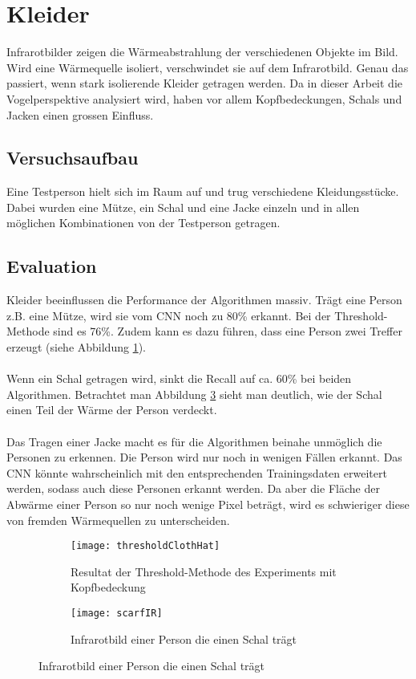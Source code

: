 \section{Kleider}
\label{sec:cloths}

Infrarotbilder zeigen die Wärmeabstrahlung der verschiedenen Objekte im Bild. Wird eine Wärmequelle isoliert, verschwindet sie auf dem Infrarotbild. Genau das passiert, wenn stark isolierende Kleider getragen werden. Da in dieser Arbeit die Vogelperspektive analysiert wird, haben vor allem Kopfbedeckungen, Schals und Jacken einen grossen Einfluss. 

\subsection{Versuchsaufbau}

Eine Testperson hielt sich im Raum auf und trug verschiedene Kleidungsstücke. Dabei wurden eine Mütze, ein Schal und eine Jacke einzeln und in allen möglichen Kombinationen von der Testperson getragen.

\subsection{Evaluation}
Kleider beeinflussen die Performance der Algorithmen massiv. Trägt eine Person z.B. eine Mütze, wird sie vom \gls{CNN} noch zu 80\% erkannt. Bei der Threshold-Methode sind es 76\%. Zudem kann es dazu führen, dass eine Person zwei Treffer erzeugt (siehe Abbildung \ref{fig:thresholdClothHat}).\\
\\
Wenn ein Schal getragen wird, sinkt die Recall auf ca. 60\% bei beiden Algorithmen. Betrachtet man Abbildung \ref{fig:scarfIR} sieht man deutlich, wie der Schal einen Teil der Wärme der Person verdeckt.\\
\\
Das Tragen einer Jacke macht es für die Algorithmen beinahe unmöglich die Personen zu erkennen. Die Person wird nur noch in wenigen Fällen erkannt. Das \gls{CNN} könnte wahrscheinlich mit den entsprechenden Trainingsdaten erweitert werden, sodass auch diese Personen erkannt werden. Da aber die Fläche der Abwärme einer Person so nur noch wenige Pixel beträgt, wird es schwieriger diese von fremden Wärmequellen zu unterscheiden.\\

\begin{figure}[H]
	\begin{subfigure}{.45\linewidth}
		\centering
		\texttt{[image: thresholdClothHat]}
		\caption{Resultat der Threshold-Methode des Experiments mit Kopfbedeckung}
		\label{fig:thresholdClothHat}
	\end{subfigure}
	\begin{subfigure}{.45\linewidth}
		\centering
		\texttt{[image: scarfIR]}
		\caption{Infrarotbild einer Person die einen Schal trägt}
		\label{fig:scarfIR}
	\end{subfigure}
	
\end{figure}


